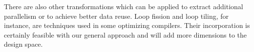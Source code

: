 There are also other transformations which can be applied to extract additional parallelism or to achieve better data reuse. Loop fission and loop tiling, for instance, are techniques used in some optimizing compilers. 
Their incorporation is certainly feasible with our general approach and will
add more dimensions to the design space. 

